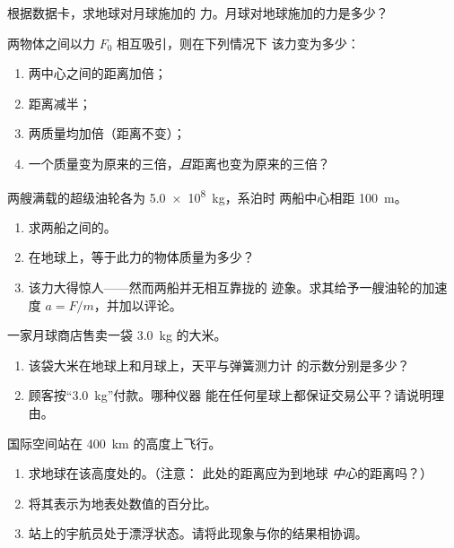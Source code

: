 \begin{exercise}[$\star$]\label{exo:g10:universal-gravitation:4}
根据数据卡，求地球对月球施加的
力。月球对地球施加的力是多少？
\end{exercise}

\begin{exercise}[$\star$]\label{exo:g10:universal-gravitation:5}
两物体之间以力 $F_0$ 相互吸引，则在下列情况下
该力变为多少：
\begin{enumerate}
  \item 两中心之间的距离加倍；
  \item 距离减半；
  \item 两质量均加倍（距离不变）；
  \item 一个质量变为原来的三倍，\emph{且}距离也变为原来的三倍？
\end{enumerate}
\end{exercise}

\begin{exercise}[$\star\star$]\label{exo:g10:universal-gravitation:6}
两艘满载的超级油轮各为 \qty{5.0e8}{kg}，系泊时
两船中心相距 \qty{100}{m}。
\begin{enumerate}
  \item 求两船之间的。
  \item 在地球上，等于此力的物体质量为多少？
  \item 该力大得惊人——然而两船并无相互靠拢的
        迹象。求其给予一艘油轮的加速度
        $a = F/m$，并加以评论。
\end{enumerate}
\end{exercise}

\begin{exercise}[$\star\star$]\label{exo:g10:universal-gravitation:7}
一家月球商店售卖一袋 \qty{3.0}{kg} 的大米。
\begin{enumerate}
  \item 该袋大米在地球上和月球上，天平与弹簧测力计
        的示数分别是多少？
  \item 顾客按“\qty{3.0}{kg}”付款。哪种仪器
        能在任何星球上都保证交易公平？请说明理由。
\end{enumerate}
\end{exercise}

\begin{exercise}[$\star\star$]\label{exo:g10:universal-gravitation:8}
国际空间站在 \qty{400}{km} 的高度上飞行。
\begin{enumerate}
  \item 求地球在该高度处的。（注意：
        此处的距离应为到地球
        \emph{中心}的距离吗？）
  \item 将其表示为地表处数值的百分比。
  \item 站上的宇航员处于漂浮状态。请将此现象与你的结果相协调。
\end{enumerate}
\end{exercise}

